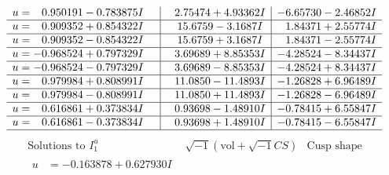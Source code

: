 \documentclass[1p]{elsarticle_modified}
\theoremstyle{definition}
\newcommand{\I}{\sqrt{-1}}
\begin{document}
$$\begin{array}{c|c|c}
\begin{aligned}
u &= \phantom{-}0.950191 - 0.783875 I\end{aligned}
 & \phantom{-}2.75474 + 4.93362 I & -6.65730 - 2.46852 I \\ \hline\begin{aligned}
u &= \phantom{-}0.909352 + 0.854322 I\end{aligned}
 & \phantom{-}15.6759 - 3.1687 I & \phantom{-}1.84371 + 2.55774 I \\ \hline\begin{aligned}
u &= \phantom{-}0.909352 - 0.854322 I\end{aligned}
 & \phantom{-}15.6759 + 3.1687 I & \phantom{-}1.84371 - 2.55774 I \\ \hline\begin{aligned}
u &= -0.968524 + 0.797329 I\end{aligned}
 & \phantom{-}3.69689 + 8.85353 I & -4.28524 - 8.34437 I \\ \hline\begin{aligned}
u &= -0.968524 - 0.797329 I\end{aligned}
 & \phantom{-}3.69689 - 8.85353 I & -4.28524 + 8.34437 I \\ \hline\begin{aligned}
u &= \phantom{-}0.979984 + 0.808991 I\end{aligned}
 & \phantom{-}11.0850 - 11.4893 I & -1.26828 + 6.96489 I \\ \hline\begin{aligned}
u &= \phantom{-}0.979984 - 0.808991 I\end{aligned}
 & \phantom{-}11.0850 + 11.4893 I & -1.26828 - 6.96489 I \\ \hline\begin{aligned}
u &= \phantom{-}0.616861 + 0.373834 I\end{aligned}
 & \phantom{-}0.93698 - 1.48910 I & -0.78415 + 6.55847 I \\ \hline\begin{aligned}
u &= \phantom{-}0.616861 - 0.373834 I\end{aligned}
 & \phantom{-}0.93698 + 1.48910 I & -0.78415 - 6.55847 I\\
 \hline 
 \end{array}$$\newpage$$\begin{array}{c|c|c}  
\text{Solutions to }I^u_{1}& \I (\text{vol} + \sqrt{-1}CS) & \text{Cusp shape}\\
 \hline 
\begin{aligned}
u &= -0.163878 + 0.627930 I\end{aligned}

\end{array}$$
\end{document}
